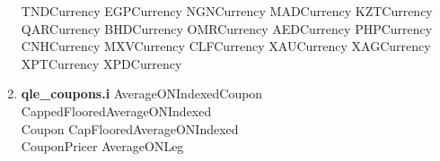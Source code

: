\documentclass[10pt]{article}
\begin{document}
\begin{multicols}{2}
\begin{enumerate}
                \subitem TNDCurrency
                \subitem EGPCurrency
                \subitem NGNCurrency
                \subitem MADCurrency
                \subitem KZTCurrency
                \subitem QARCurrency
                \subitem BHDCurrency
                \subitem OMRCurrency
                \subitem AEDCurrency
                \subitem PHPCurrency
                \subitem CNHCurrency
                \subitem MXVCurrency
                \subitem CLFCurrency
                \subitem XAUCurrency
                \subitem XAGCurrency
                \subitem XPTCurrency
                \subitem XPDCurrency
        \item \textbf{qle\_coupons.i}
                \subitem AverageONIndexedCoupon
                \subitem CappedFlooredAverageONIndexed \\ \-\hspace{0.70cm}Coupon
                \subitem CapFlooredAverageONIndexed \\ \-\hspace{0.70cm}CouponPricer
                \subitem AverageONLeg
    \end{enumerate}
\end{multicols}

\pagebreak
\end{document}
